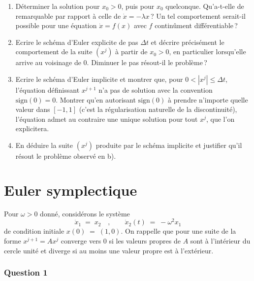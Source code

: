\begin{enumerate}
\def\labelenumi{\alph{enumi})}
\tightlist
\item
  Déterminer la solution pour \(x_0>0\), puis pour \(x_0\) quelconque.
  Qu'a-t-elle de remarquable par rapport à celle de
  \(\dot{x}=-\lambda x\)\,? Un tel comportement serait-il possible pour
  une équation \(\dot{x}=f(x)\) avec \(f\) continûment différentiable\,?
\item
  Ecrire le schéma d'Euler explicite de pas \({\Delta t}\) et décrire
  précisément le comportement de la suite \((x^j)\) à partir de
  \(x_0>0\), en particulier lorsqu'elle arrive au voisinage de 0.
  Diminuer le pas résout-il le problème\,?
\item
  Ecrire le schéma d'Euler implicite et montrer que, pour
  \(0<|x^j|\leq {\Delta t}\), l'équation définissant \(x^{j+1}\) n'a pas
  de solution avec la convention \(\mathrm{sign}(0)=0\). Montrer qu'en
  autorisant \(\mathrm{sign}(0)\) à prendre n'importe quelle valeur dans
  \([-1,1]\) (c'est la régularisation naturelle de la discontinuité),
  l'équation admet au contraire une unique solution pour tout \(x^j\),
  que l'on explicitera.
\item
  En déduire la suite \((x^j)\) produite par le schéma implicite et
  justifier qu'il résout le problème observé en b). 
\end{enumerate}

\hypertarget{ed2-exo_symplectique}{%
\section{Euler symplectique}\label{ed2-exo_symplectique}}

Pour \(\omega>0\) donné, considérons le système \[
\dot{x}_1 \;=\;  x_2
\quad ,\qquad 
\dot{x}_2(t)\;=\; -\omega^2 x_1
\] de condition initiale \(x(0)\;=\; (1,0)\). On rappelle que pour une
suite de la forme \(x^{j+1}=A x^j\) converge vers 0 si les valeurs
propres de \(A\) sont à l'intérieur du cercle unité et diverge si au
moins une valeur propre est à l'extérieur.

\hypertarget{ed2-symp-1}{%
\subsubsection*{Question 1}\label{ed2-symp-1}}

